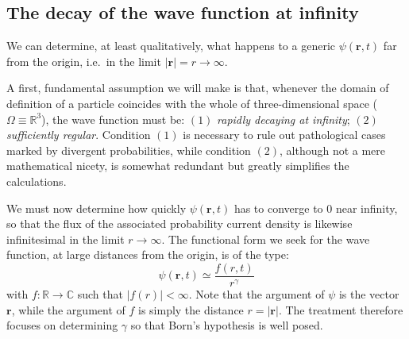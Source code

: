 \subsection{The decay of the wave function at infinity}
We can determine, at least qualitatively, what happens to a generic $\psi(\bm{r},t)$ far from the origin, i.e.\ in the limit $|\bm{r}| = r \to \infty$.

A first, fundamental assumption we will make is that, whenever the domain of definition of a particle coincides with the whole of three-dimensional space ($\Omega \equiv \mathbb{R}^3$), the wave function must be: $(1)$ \emph{rapidly decaying at infinity}; $(2)$ \emph{sufficiently regular}. Condition $(1)$ is necessary to rule out pathological cases marked by divergent probabilities, while condition $(2)$, although not a mere mathematical nicety, is somewhat redundant but greatly simplifies the calculations.

We must now determine how quickly $\psi(\bm{r},t)$ has to converge to $0$ near infinity, so that the flux of the associated probability current density is likewise infinitesimal in the limit $r \to \infty$. The functional form we seek for the wave function, at large distances from the origin, is of the type:
\begin{equation}
        \psi(\bm{r},t) \simeq \frac{f(r,t)}{r^\gamma} 
        \label{eq:psi_r_grande}
\end{equation} 
with $f:\mathbb{R} \to \mathbb{C}$ such that $|f(r)| < \infty$. Note that the argument of $\psi$ is the vector $\bm{r}$, while the argument of $f$ is simply the distance $r = |\bm{r}|$. The treatment therefore focuses on determining $\gamma$ so that Born's hypothesis is well posed.

